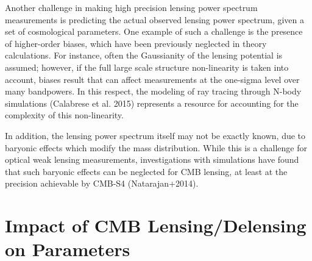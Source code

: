 \documentclass{tcibook}
\begin{document}
Another challenge in making high precision lensing power spectrum measurements is predicting the actual observed lensing power spectrum, given a set of cosmological parameters. One example of such a challenge is the presence of higher-order biases, which have been previously neglected in theory calculations. For instance, often the Gaussianity of the lensing potential is assumed; however, if the full large scale structure non-linearity is taken into account, biases result that can affect measurements at the one-sigma level over many bandpowers. In this respect, the modeling of ray tracing through N-body simulations (Calabrese et al. 2015) %
represents a resource for accounting for the complexity of this non-linearity.


In addition, the lensing power spectrum itself may not be exactly known, due to baryonic effects which modify the mass distribution. While this is a challenge for optical weak lensing measurements, investigations with simulations have found that such baryonic effects can be neglected for CMB lensing, at least at the precision achievable by CMB-S4 (Natarajan+2014).

\section{Impact of CMB Lensing/Delensing on Parameters}\label{forecasts}
\end{document}
